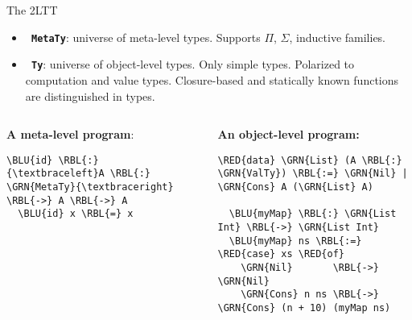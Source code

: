 \documentclass[dvipsnames,aspectratio=169]{beamer}
\newcommand{\ttt}[1]{{\texttt{#1}}}
\theoremstyle{remark}
\newcommand{\RED}[1]{{\color{BrickRed} #1}}
\newcommand{\GRN}[1]{{\color{OliveGreen} #1}}
\newcommand{\RBL}[1]{{\color{RoyalBlue} #1}}
\newcommand{\BLU}[1]{{\color{Blue} #1}}
\begin{document}

\begin{frame}[fragile]{The 2LTT}

\begin{itemize}
  \item \textbf{\ttt{\GRN{MetaTy}}}: universe of meta-level types. Supports $\Pi$, $\Sigma$, inductive families.
  \item \textbf{\ttt{\GRN{Ty}}}: universe of object-level types. Only simple types. Polarized to computation and value types.
    \alert{Closure-based and statically known functions are distinguished in types}.
\end{itemize}
\vspace{2em}

\begin{columns}
\begin{column}{0.4\textwidth}
\textbf{A meta-level program}:
\begin{Verbatim}[commandchars=\\\{\}]
  \BLU{id} \RBL{:} {\textbraceleft}A \RBL{:} \GRN{MetaTy}{\textbraceright} \RBL{->} A \RBL{->} A
  \BLU{id} x \RBL{=} x




\end{Verbatim}
\end{column}

\begin{column}{0.6\textwidth}
\textbf{An object-level program:}
\begin{Verbatim}[commandchars=\\\{\}]
  \RED{data} \GRN{List} (A \RBL{:} \GRN{ValTy}) \RBL{:=} \GRN{Nil} | \GRN{Cons} A (\GRN{List} A)

  \BLU{myMap} \RBL{:} \GRN{List Int} \RBL{->} \GRN{List Int}
  \BLU{myMap} ns \RBL{:=} \RED{case} xs \RED{of}
    \GRN{Nil}       \RBL{->} \GRN{Nil}
    \GRN{Cons} n ns \RBL{->} \GRN{Cons} (n + 10) (myMap ns)
\end{Verbatim}
\end{column}
\end{columns}


\end{frame}
\end{document}
